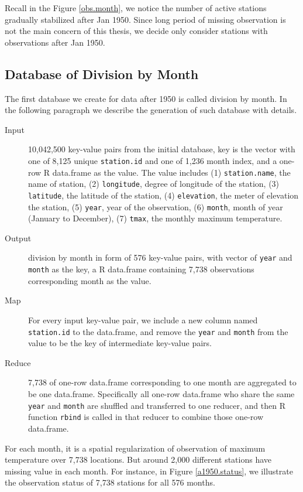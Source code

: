 Recall in the Figure \href{../plots/obs_month.pdf}{\ref*{obs.month}}, we notice
the number of active stations gradually stabilized after Jan 1950. Since long
period of missing observation is not the main concern of this thesis, we decide
only consider stations with observations after Jan 1950.

\subsection{Database of Division by Month}

The first database we create for data after 1950 is called division by month. In
the following paragraph we describe the generation of such database with details.

\begin{description}
  \item[Input] 10,042,500 key-value pairs from the initial database, key is the
  vector with one of 8,125 unique \texttt{station.id} and one of 1,236 month 
  index, and a one-row R data.frame as the value. The value includes 
  (1) \texttt{station.name}, the name of station, (2) \texttt{longitude}, degree 
  of longitude of the station, (3) \texttt{latitude}, the latitude of the station, 
  (4) \texttt{elevation}, the meter of elevation the station, (5) \texttt{year}, 
  year of the observation, (6) \texttt{month}, month of year (January to 
  December), (7) \texttt{tmax}, the monthly maximum temperature.
  \item[Output] division by month in form of 576 key-value pairs, with vector of
  \texttt{year} and \texttt{month} as the key, a R data.frame containing 7,738 
  observations corresponding month as the value.
  \item[Map]For every input key-value pair, we include a new column named 
  \texttt{station.id} to the data.frame, and remove the \texttt{year} and 
  \texttt{month} from the value to be the key of intermediate key-value pairs. 
  \item[Reduce] 7,738 of one-row data.frame corresponding to one month are 
  aggregated to be one data.frame. Specifically all one-row data.frame who share
  the same \texttt{year} and \texttt{month} are shuffled and transferred to one 
  reducer, and then R function \texttt{rbind} is called in that reducer to combine 
  those one-row data.frame.
\end{description}


For each month, it is a spatial regularization of observation of maximum 
temperature over 7,738 locations. But around 2,000 different stations have 
missing value in each month. For instance, in Figure 
\href{../plots/tmax.a1950.status.pdf}{\ref*{a1950.status}},
we illustrate the observation status of 7,738 stations for all 576 months.

